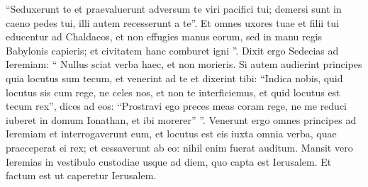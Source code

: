 \begin{biblechapter}
\begin{biblechapter}
\begin{biblechapter}
\begin{biblechapter}
\begin{biblechapter}
\begin{biblechapter}
\begin{biblechapter}
\begin{biblechapter}
\begin{biblechapter}
\begin{biblechapter}
\begin{biblechapter}
\begin{biblechapter}
\begin{biblechapter}
\begin{biblechapter}
\begin{biblechapter}
\begin{biblechapter}
\begin{biblechapter}
\begin{biblechapter}
\begin{biblechapter}
\begin{biblechapter}
\begin{biblechapter}
\begin{biblechapter}
\begin{biblechapter}
\begin{biblechapter}
\begin{biblechapter}
\begin{biblechapter}
\begin{biblechapter}
\begin{biblechapter}
\begin{biblechapter}
\begin{biblechapter}
\begin{biblechapter}
\begin{biblechapter}
\begin{biblechapter}
\begin{biblechapter}
\begin{biblechapter}
\begin{biblechapter}
\begin{biblechapter}
\begin{biblechapter}
 “Seduxerunt te et praevaluerunt adversum te
 viri pacifici tui;
 demersi sunt in caeno pedes tui,
 illi autem recesserunt a te”.
 \verse Et omnes uxores tuae et filii tui educentur ad Chaldaeos, et non effugies manus eorum, sed in manu regis Babylonis capieris; et civitatem hanc comburet igni ”.
 \verse Dixit ergo Sedecias ad Ieremiam: “ Nullus sciat verba haec, et non morieris. 
 \verse Si autem audierint principes quia locutus sum tecum, et venerint ad te et dixerint tibi: “Indica nobis, quid locutus sis cum rege, ne celes nos, et non te interficiemus, et quid locutus est tecum rex”, 
\verse dices ad eos: “Prostravi ego preces meas coram rege, ne me reduci iuberet in domum Ionathan, et ibi morerer” ”. 
\verse Venerunt ergo omnes principes ad Ieremiam et interrogaverunt eum, et locutus est eis iuxta omnia verba, quae praeceperat ei rex; et cessaverunt ab eo: nihil enim fuerat auditum. 
\verse Mansit vero Ieremias in vestibulo custodiae usque ad diem, quo capta est Ierusalem.
 Et factum est ut caperetur Ierusalem.
 

\end{biblechapter}
\end{biblechapter}
\end{biblechapter}
\end{biblechapter}
\end{biblechapter}
\end{biblechapter}
\end{biblechapter}
\end{biblechapter}
\end{biblechapter}
\end{biblechapter}
\end{biblechapter}
\end{biblechapter}
\end{biblechapter}
\end{biblechapter}
\end{biblechapter}
\end{biblechapter}
\end{biblechapter}
\end{biblechapter}
\end{biblechapter}
\end{biblechapter}
\end{biblechapter}
\end{biblechapter}
\end{biblechapter}
\end{biblechapter}
\end{biblechapter}
\end{biblechapter}
\end{biblechapter}
\end{biblechapter}
\end{biblechapter}
\end{biblechapter}
\end{biblechapter}
\end{biblechapter}
\end{biblechapter}
\end{biblechapter}
\end{biblechapter}
\end{biblechapter}
\end{biblechapter}
\end{biblechapter}
